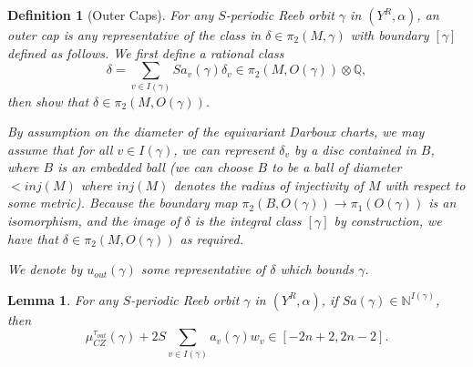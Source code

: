 \documentclass[10pt,a4paper]{amsart}
\newtheorem{defn}{Definition}
\newtheorem{lem}{Lemma}
\begin{document}
\begin{defn}[Outer Caps]
\label{outer_caps}
For any $S$-periodic Reeb orbit $\gamma$ in $(Y^R,\alpha)$, an outer cap is any representative of the class in $\delta\in\pi_2(M,\gamma)$ with boundary $[\gamma]$ defined as follows. We first define a rational class
\begin{equation}
    \delta=\sum_{v\in I(\gamma)}Sa_v(\gamma)\delta_v\in \pi_2(M,O(\gamma))\otimes\mathbb{Q},
\end{equation}
then show that $\delta\in\pi_2(M,O(\gamma))$.

By assumption on the diameter of the equivariant Darboux charts, we may assume that for all $v\in I(\gamma)$, we can represent $\delta_v$ by a disc contained in $B$, where $B$ is an embedded ball (we can choose $B$ to be a ball of diameter $<inj(M)$ where $inj(M)$ denotes the radius of injectivity of $M$ with respect to some metric). Because the boundary map $\pi_2(B,O(\gamma))\rightarrow \pi_1(O(\gamma))$ is an isomorphism, and the image of $\delta$ is the integral class $[\gamma]$ by construction, we have that $\delta\in\pi_2(M,O(\gamma))$ as required.

We denote by $u_{out}(\gamma)$ some representative of $\delta$ which bounds $\gamma$.
\end{defn}

\begin{lem}
\label{integral_orbit_index}
    For any $S$-periodic Reeb orbit $\gamma$ in $(Y^R,\alpha)$, if $Sa(\gamma)\in\mathbb{N}^{I(\gamma)}$, then
    \begin{equation}
        \mu_{CZ}^{\tau_{out}}(\gamma)+2S\sum_{v\in I(\gamma)}a_v(\gamma)w_v\in [-2n+2,2n-2].
    \end{equation}
\end{lem}
\end{document}
